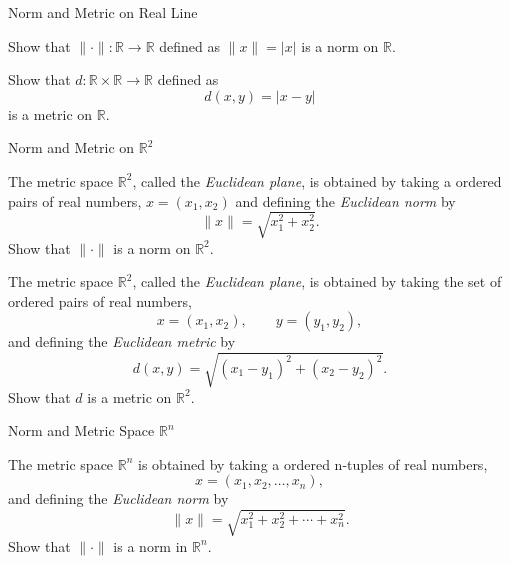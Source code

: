 \documentclass[12pt, a4paper]{article}
\begin{document}
\clearpage

\begin{heading}
    Norm and Metric on Real Line
\end{heading}

\vspace{10pt}

\begin{theorem}
    Show that $\|\cdot\|:\mathbb{R}\to\mathbb{R}$ defined as $\|x\|=|x|$ is a norm on $\mathbb{R}$.
\end{theorem}

\clearpage

\begin{theorem}
    Show that $d:\mathbb{R}\times\mathbb{R}\to\mathbb{R}$ defined as
    \[
        d(x,y)=|x-y|
    \]
    is a metric on $\mathbb{R}$.
\end{theorem}

\clearpage

\begin{heading}
    Norm and Metric on $\mathbb{R}^2$
\end{heading}

\begin{theorem}
    The metric space $\mathbb{R}^2$, called the \emph{Euclidean plane}, is obtained by
    taking a ordered pairs of real numbers,
    \(
    x=(x_1,x_2)
    \)
    and defining the \emph{Euclidean norm} by
    \[
    \|x\|=\sqrt{x_1^2+x_2^2}.
    \]
    Show that $\|\cdot\|$ is a norm on $\mathbb{R}^2$.
\end{theorem}

\clearpage

\begin{theorem}
    The metric space $\mathbb{R}^2$, called the \emph{Euclidean plane}, is obtained by
    taking the set of ordered pairs of real numbers,
    \[
    x=(x_1,x_2), \qquad y=(y_1,y_2),
    \]
    and defining the \emph{Euclidean metric} by
    \[
    d(x,y)=\sqrt{(x_1-y_1)^2+(x_2-y_2)^2}.
    \]
    Show that $d$ is a metric on $\mathbb{R}^2$.
\end{theorem}

\clearpage

\begin{heading}
    Norm and Metric Space $\mathbb{R}^n$
\end{heading}

\begin{theorem}
    The metric space $\mathbb{R}^n$ is obtained by taking a ordered n-tuples of
    real numbers,
    \[
    x=(x_1,x_2,\ldots,x_n),
    \]
    and defining the \emph{Euclidean norm} by
    \[
    \|x\|=\sqrt{x_1^2+x_2^2+\cdots+x_n^2}.
    \]
    Show that $\|\cdot\|$ is a norm in $\mathbb{R}^n$.
\end{theorem}
\end{document}
